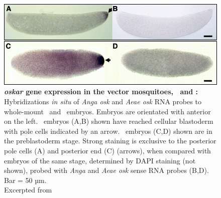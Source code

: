 
\begin{figure}[h]
\centering \sffamily

\includegraphics[width=.8\textwidth]{figures/figs/oskar_expression_AaAg.png}

\caption[\textit{oskar} gene expression in the vector mosquitoes, \Ang\ and \Aea]{\sf \textbf{\textit{oskar} gene expression in the vector mosquitoes, \Ang\ and \Aea:} \\
 Hybridizations \textit{in situ} of \textit{Anga osk} and \textit{Aeae osk} RNA probes to whole-mount \Ag\ and \Aa\ embryos. Embryos are orientated with anterior on the left. \Ag\ embryos (A,B) shown have reached cellular blastoderm with pole cells indicated by an arrow. \Aa\ embryos (C,D) shown are in the preblastoderm stage. Strong staining is exclusive to the posterior pole cells (A) and posterior end (C) (arrows), when compared with embryos of the same stage, determined by DAPI staining (not shown), probed with \textit{Anga} and \textit{Aeae osk} sense RNA probes (B,D). Bar = 50 µm.\\
 
 Excerpted from \cite{Juhn2006}}\label{fig:pole-cells}
\end{figure}